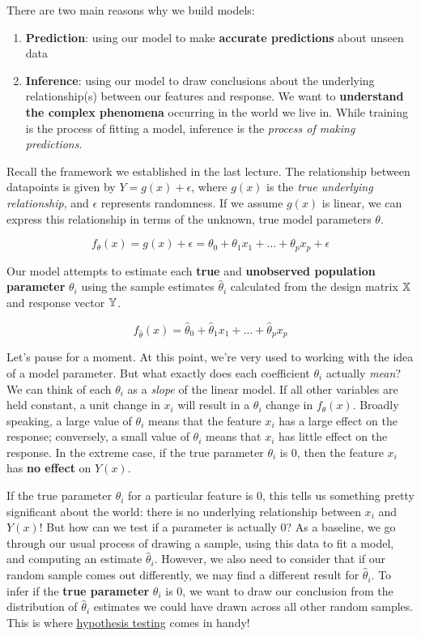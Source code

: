 \documentclass[
  letterpaper,
  DIV=11,
  numbers=noendperiod]{scrreprt}
\providecommand{\tightlist}{%
  \setlength{\itemsep}{0pt}\setlength{\parskip}{0pt}}\usepackage{longtable,booktabs,array}
\begin{document}
There are two main reasons why we build models:

\begin{enumerate}
\def\labelenumi{\arabic{enumi}.}
\tightlist
\item
  \textbf{Prediction}: using our model to make \textbf{accurate
  predictions} about unseen data
\item
  \textbf{Inference}: using our model to draw conclusions about the
  underlying relationship(s) between our features and response. We want
  to \textbf{understand the complex phenomena} occurring in the world we
  live in. While training is the process of fitting a model, inference
  is the \emph{process of making predictions}.
\end{enumerate}

Recall the framework we established in the last lecture. The
relationship between datapoints is given by \(Y = g(x) + \epsilon\),
where \(g(x)\) is the \emph{true underlying relationship}, and
\(\epsilon\) represents randomness. If we assume \(g(x)\) is linear, we
can express this relationship in terms of the unknown, true model
parameters \(\theta\).

\[f_{\theta}(x) = g(x) + \epsilon = \theta_0 + \theta_1 x_1 + \ldots + \theta_p x_p + \epsilon\]

Our model attempts to estimate each \textbf{true} and \textbf{unobserved
population parameter} \(\theta_i\) using the sample estimates
\(\hat{\theta}_i\) calculated from the design matrix \(\Bbb{X}\) and
response vector \(\Bbb{Y}\).

\[f_{\hat{\theta}}(x) = \hat{\theta}_0 + \hat{\theta}_1 x_1 + \ldots + \hat{\theta}_p x_p\]

Let's pause for a moment. At this point, we're very used to working with
the idea of a model parameter. But what exactly does each coefficient
\(\theta_i\) actually \emph{mean}? We can think of each \(\theta_i\) as
a \emph{slope} of the linear model. If all other variables are held
constant, a unit change in \(x_i\) will result in a \(\theta_i\) change
in \(f_{\theta}(x)\). Broadly speaking, a large value of \(\theta_i\)
means that the feature \(x_i\) has a large effect on the response;
conversely, a small value of \(\theta_i\) means that \(x_i\) has little
effect on the response. In the extreme case, if the true parameter
\(\theta_i\) is 0, then the feature \(x_i\) has \textbf{no effect} on
\(Y(x)\).

If the true parameter \(\theta_i\) for a particular feature is 0, this
tells us something pretty significant about the world: there is no
underlying relationship between \(x_i\) and \(Y(x)\)! But how can we
test if a parameter is actually 0? As a baseline, we go through our
usual process of drawing a sample, using this data to fit a model, and
computing an estimate \(\hat{\theta}_i\). However, we also need to
consider that if our random sample comes out differently, we may find a
different result for \(\hat{\theta}_i\). To infer if the \textbf{true
parameter} \(\theta_i\) is 0, we want to draw our conclusion from the
distribution of \(\hat{\theta}_i\) estimates we could have drawn across
all other random samples. This is where
\href{https://inferentialthinking.com/chapters/11/Testing_Hypotheses.html}{hypothesis
testing} comes in handy!
\end{document}
